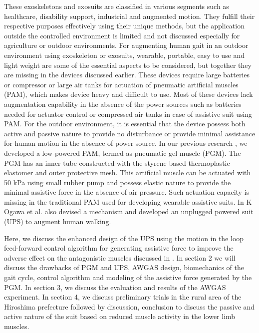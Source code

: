 \documentclass[paper,JRM,paper]{jaciiiarticle}
\begin{document}
These exoskeletons and exosuits are classified in various segments such as healthcare, disability support, industrial and augmented motion. They fulfill their respective purposes effectively using their unique methods, but the application outside the controlled environment is limited and not discussed especially for agriculture or outdoor environments. For augmenting human gait in an outdoor environment using exoskeleton or exosuits, wearable, portable, easy to use and light weight are some of the essential aspects to be considered, but together they are missing in the devices discussed earlier. These devices require large batteries or compressor or large air tanks for actuation of pneumatic artificial muscles (PAM), which makes device heavy and difficult to use. Most of these devices lack augmentation capability in the absence of the power sources such as batteries needed for actuator control or compressed air tanks in case of assistive suit using PAM. For the outdoor environment, it is essential that the device possess both active and passive nature to provide no disturbance or provide minimal assistance for human motion in the absence of power source. In our previous research \cite{13}, we developed a low-powered PAM, termed as pneumatic gel muscle (PGM). The PGM has an inner tube constructed with the styrene-based thermoplastic elastomer and outer protective mesh. This artificial muscle can be actuated with 50 kPa using small rubber pump and possess elastic nature to provide the minimal assistive force in the absence of air pressure. Such actuation capacity is missing in the traditional PAM used for developing wearable assistive suits. In \cite{13} K Ogawa et al. also devised a mechanism and developed an unplugged powered suit (UPS) to augment human walking.

Here, we discuss the enhanced design of the UPS using the motion in the loop feed-forward control algorithm for generating assistive force to improve the adverse effect on the antagonistic muscles discussed in \cite{13}. In section 2 we will discuss the drawbacks of PGM and UPS, AWGAS design, biomechanics of the gait cycle, control algorithm and modeling of the assistive force generated by the PGM. In section 3, we discuss the evaluation and results of the AWGAS experiment. In section 4, we discuss preliminary trials in the rural area of the Hiroshima prefecture followed by discussion, conclusion to discuss the passive and active nature of the suit based on reduced muscle activity in the lower limb muscles.
\end{document}
